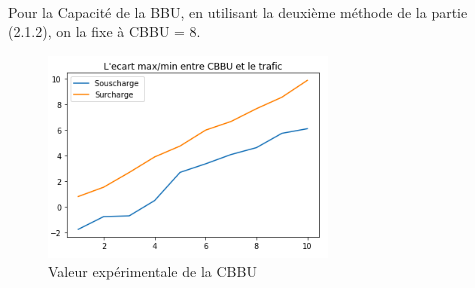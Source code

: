 \documentclass{report}
\begin{document}
\paragraph{}
Pour la Capacité de la BBU, en utilisant la deuxième méthode de la partie (2.1.2), on la fixe à CBBU = 8.
\begin{figure}[H]
  \centering
  \includegraphics[width=20em]{images/ecartCBBU0320.png}
  \caption{Valeur expérimentale de la CBBU }
\end{figure}
\end{document}
